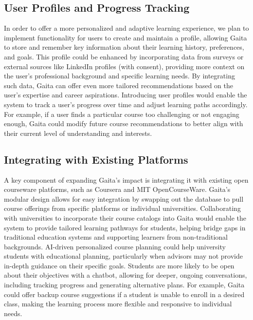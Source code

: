 \subsection{User Profiles and Progress Tracking} 

In order to offer a more personalized and adaptive learning experience, we plan to implement functionality for users to create and maintain a profile, allowing Gaita to store and remember key information about their learning history, preferences, and goals. This profile could be enhanced by incorporating data from surveys or external sources like LinkedIn profiles (with consent), providing more context on the user’s professional background and specific learning needs. By integrating such data, Gaita can offer even more tailored recommendations based on the user’s expertise and career aspirations. Introducing user profiles would enable the system to track a user’s progress over time and adjust learning paths accordingly. For example, if a user finds a particular course too challenging or not engaging enough, Gaita could modify future course recommendations to better align with their current level of understanding and interests. 

\subsection{Integrating with Existing Platforms}

A key component of expanding Gaita’s impact is integrating it with existing open courseware platforms, such as Coursera and MIT OpenCourseWare. Gaita’s modular design allows for easy integration by swapping out the database to pull course offerings from specific platforms or individual universities. Collaborating with universities to incorporate their course catalogs into Gaita would enable the system to provide tailored learning pathways for students, helping bridge gaps in traditional education systems and supporting learners from non-traditional backgrounds. AI-driven personalized course planning could help university students with educational planning, particularly when advisors may not provide in-depth guidance on their specific goals. Students are more likely to be open about their objectives with a chatbot, allowing for deeper, ongoing conversations, including tracking progress and generating alternative plans. For example, Gaita could offer backup course suggestions if a student is unable to enroll in a desired class, making the learning process more flexible and responsive to individual needs.
